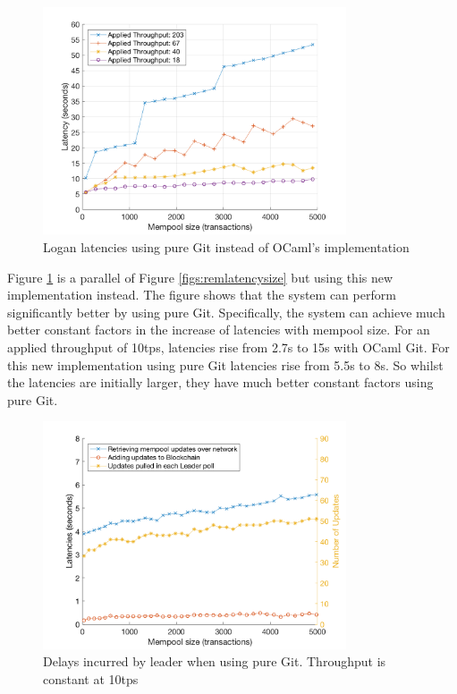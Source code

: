 \documentclass[12pt,a4paper,twoside,openright]{report}
\begin{document}
	\begin{figure} 
		\centering
		\includegraphics[width=0.8\textwidth]{figs/latency_sizes_throughputs.png}
		\caption{Logan latencies using pure Git instead of OCaml's implementation}
		\label{figs:latenciespuregit}
	\end{figure}
	Figure \ref{figs:latenciespuregit} is a parallel of Figure \ref{figs:remlatencysize} but using this new implementation instead. 
	The figure shows that the system can perform significantly better by using pure Git. 
	Specifically, the system can achieve much better constant factors in the increase of latencies with mempool size.
	For an applied throughput of 10tps, latencies rise from 2.7s to 15s with OCaml Git. 
	For this new implementation using pure Git latencies rise from 5.5s to 8s. 
	So whilst the latencies are initially larger, they have much better constant factors using pure Git.
	\begin{figure}
		\centering
		\includegraphics[width=0.8\textwidth]{figs/bottlenecks.png}
		\caption{Delays incurred by leader when using pure Git. Throughput is constant at 10tps}
		\label{figs:bottleneckspuregit} 
	\end{figure}
\end{document}

